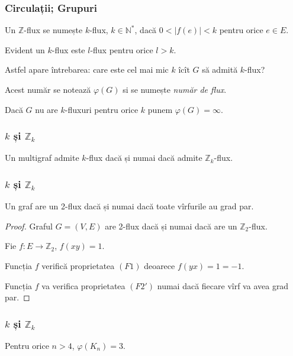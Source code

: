 \begin{frame}
  \frametitle{Circulații; Grupuri}

Un $\mathbb{Z}$-flux se numește $k$-flux, $k\in\mathbb{N^*}$, dacă $0<|f(e)|<k$ pentru orice $e\in E$.

Evident un $k$-flux este $l$-flux pentru orice $l>k$.

Astfel apare întrebarea: care este cel mai mic $k$ îcît $G$ să admită $k$-flux?

Acest număr se notează $\varphi(G)$ si se numește \emph{număr de flux}.

Dacă $G$ nu are $k$-fluxuri pentru orice $k$ punem $\varphi(G)=\infty$.

\end{frame}

\begin{frame}
  \frametitle{$k$ și $\mathbb{Z}_k$}

\begin{theorem}
Un multigraf admite $k$-flux dacă și  numai dacă admite $\mathbb{Z}_k$-flux.  
\end{theorem}

\end{frame}


\begin{frame}
  \frametitle{$k$ și $\mathbb{Z}_k$}

\begin{theorem}
Un graf are un 2-flux dacă și numai dacă toate vîrfurile au grad par.  
\end{theorem}

\begin{proof}
Graful $G=(V,E)$ are 2-flux dacă și numai dacă are un $\mathbb{Z}_2$-flux.

Fie $f:E\to\mathbb{Z}_2$, $f(xy)=1$.

Funcția $f$ verifică proprietatea $(F1)$ deoarece $f(yx)=1=-1$.

Funcția $f$ va verifica proprietatea $(F2')$ numai dacă fiecare vîrf va avea grad par. 
\end{proof}


\end{frame}

\begin{frame}
  \frametitle{$k$ și $\mathbb{Z}_k$}

\begin{theorem}
Pentru orice $n>4$, $\varphi(K_n)=3$. 
\end{theorem}

\end{frame}

